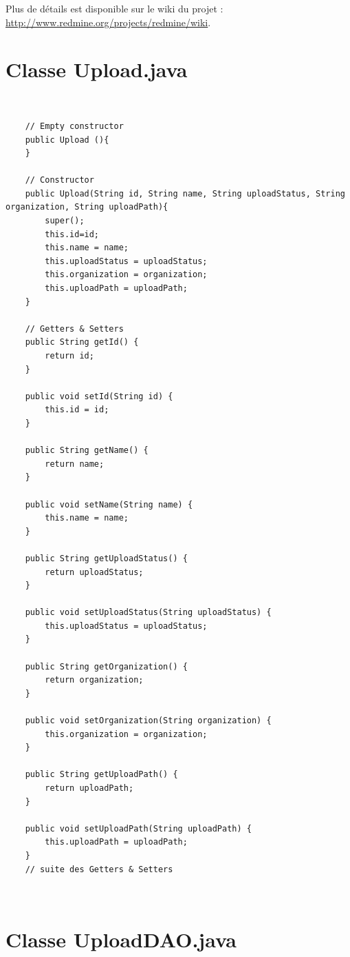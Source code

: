 Plus de détails est disponible sur le wiki du projet : \url{http://www.redmine.org/projects/redmine/wiki}.

\pagebreak

\section{Classe Upload.java}\label{Annexe B}\\

\begin{lstlisting}
	// Empty constructor
	public Upload (){
	}

    // Constructor
    public Upload(String id, String name, String uploadStatus, String organization, String uploadPath){
        super();
        this.id=id;
        this.name = name;
        this.uploadStatus = uploadStatus;
        this.organization = organization;
        this.uploadPath = uploadPath;
    }
    
    // Getters & Setters
    public String getId() {
        return id;
    }

    public void setId(String id) {
        this.id = id;
    }
    
    public String getName() {
        return name;
    }

    public void setName(String name) {
        this.name = name;
    }

    public String getUploadStatus() {
        return uploadStatus;
    }

    public void setUploadStatus(String uploadStatus) {
        this.uploadStatus = uploadStatus;
    }

    public String getOrganization() {
        return organization;
    }

    public void setOrganization(String organization) {
        this.organization = organization;
    }

    public String getUploadPath() {
        return uploadPath;
    }

    public void setUploadPath(String uploadPath) {
        this.uploadPath = uploadPath;
    }
	// suite des Getters & Setters
\end{lstlisting} \\

\pagebreak

\section{Classe UploadDAO.java}\label{Annexe C}\\

